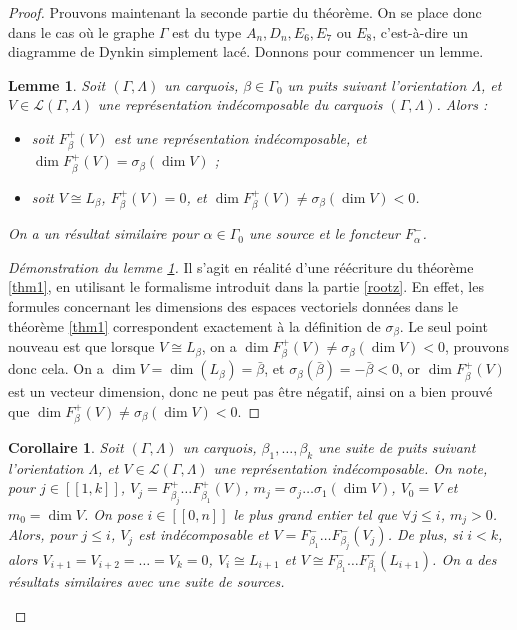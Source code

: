 \documentclass[a4paper,11pt]{article}
\newtheorem{lm}[thm]{Lemme}%
\newtheorem{cor}[thm]{Corollaire}%
\newcommand{\ent}[2]{[\![#1,#2]\!]}
\begin{document}
\begin{proof}
	Prouvons maintenant la seconde partie du théorème. On se place donc dans le cas où le graphe $\Gamma$ est du type $A_n,D_n,E_6,E_7$ ou $E_8$, c'est-à-dire un diagramme de Dynkin simplement lacé. Donnons pour commencer un lemme.
	\begin{lm}
		\label{lmbidon}
		Soit $(\Gamma,\Lambda)$ un carquois, $\beta\in\Gamma_0$ un puits suivant l'orientation $\Lambda$, et $V\in\mathscr L(\Gamma,\Lambda)$ une représentation indécomposable du carquois $(\Gamma,\Lambda)$. Alors :
		\begin{itemize}
			\item soit $F_\beta^+(V)$ est une représentation indécomposable, et $\dim F_\beta^+(V)=\sigma_\beta(\dim V)$ ;
			\item soit $V\cong L_\beta$, $F_\beta^+(V)=0$, et $\dim F_\beta^+(V)\neq\sigma_\beta(\dim V)<0$.
		\end{itemize}
On a un résultat similaire pour $\alpha\in\Gamma_0$ une source et le foncteur $F_\alpha^-$.
	\end{lm}
	\begin{proof}[Démonstration du lemme \ref{lmbidon}]
		Il s'agit en réalité d'une réécriture du théorème \ref{thm1}, en utilisant le formalisme introduit dans la partie \ref{rootz}. En effet, les formules concernant les dimensions des espaces vectoriels données dans le théorème \ref{thm1} correspondent exactement à la définition de $\sigma_\beta$. Le seul point nouveau est que lorsque $V\cong L_\beta$, on a $\dim F_\beta^+(V)\neq\sigma_\beta(\dim V)<0$, prouvons donc cela. On a $\dim V=\dim (L_\beta)=\bar\beta$, et $\sigma_\beta(\bar\beta)=-\bar\beta<0$, or $\dim F_\beta^+(V)$ est un vecteur dimension, donc ne peut pas être négatif, ainsi on a bien prouvé que $\dim F_\beta^+(V)\neq\sigma_\beta(\dim V)<0$.
	\end{proof}
	\begin{cor}
	\label{cor3.1}
	Soit $(\Gamma,\Lambda)$ un carquois, $\beta_1,\dots,\beta_k$ une suite de puits suivant l'orientation $\Lambda$, et $V\in\mathscr L(\Gamma,\Lambda)$ une représentation indécomposable. On note, pour $j\in\ent{1}{k}$,  $V_j=F_{\beta_j}^+\dots F_{\beta_1}^+(V)$, $m_j=\sigma_j\dots\sigma_1(\dim V)$, $V_0=V$ et $m_0=\dim V$. On pose $i\in\ent{0}{n}$ le plus grand entier tel que $\forall j\leq i$, $m_j>0$. Alors, pour $j\leq i$, $V_j$ est indécomposable et $V=F_{\beta_1}^-\dots F_{\beta_j}^-(V_j)$. De plus, si $i<k$, alors $V_{i+1}=V_{i+2}=\dots=V_{k}=0$, $V_i\cong L_{i+1}$ et $V\cong F_{\beta_1}^-\dots F_{\beta_{i}}^-(L_{i+1})$. On a des résultats similaires avec une suite de sources.

\end{cor}
\end{proof}
\end{document}
